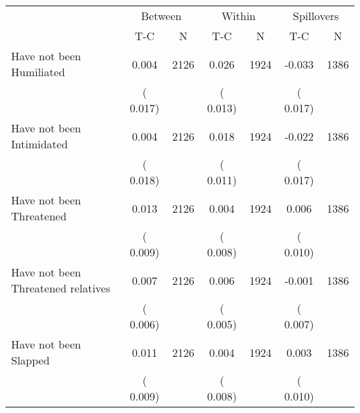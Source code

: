 
\begin{tabular}{l*{6}{c}}\hline&\multicolumn{2}{c}{Between}&\multicolumn{2}{c}{Within}&\multicolumn{2}{c}{Spillovers} \\ \cmidrule(r){2-3}\cmidrule(l){4-5}\cmidrule(l){6-7} & {T-C} & {N} & {T-C} & {N}  & {T-C}  & {N}  \\ \midrule
Have not been Humiliated        &              0.004      &       2126       &              0.026      &       1924       &             -0.033      &       1386       \\
                       &       (       0.017)            &                               &       (       0.013)            &                               &       (       0.017)            &                               \\
Have not been Intimidated        &              0.004      &       2126       &              0.018      &       1924       &             -0.022      &       1386       \\
                       &       (       0.018)            &                               &       (       0.011)            &                               &       (       0.017)            &                               \\
Have not been Threatened        &              0.013      &       2126       &              0.004      &       1924       &              0.006      &       1386       \\
                       &       (       0.009)            &                               &       (       0.008)            &                               &       (       0.010)            &                               \\
Have not been Threatened relatives        &              0.007      &       2126       &              0.006      &       1924       &             -0.001      &       1386       \\
                       &       (       0.006)            &                               &       (       0.005)            &                               &       (       0.007)            &                               \\
Have not been Slapped        &              0.011      &       2126       &              0.004      &       1924       &              0.003      &       1386       \\
                       &       (       0.009)            &                               &       (       0.008)            &                               &       (       0.010)            &                               \\

\end{tabular}

